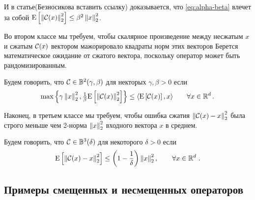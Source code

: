 \documentclass[12pt, twoside]{article}
\begin{document}
И в статье(Безносикова вставить ссылку) доказывается, что \eqref{eq:alpha-beta} влечет за собой ${{\rm E}}\left[ \left\| {\cal C}(x) \right\|_2^2 \right] \leq \beta^2 \left\| x \right\|_2^2$. 

Во втором классе мы требуем, чтобы скалярное произведение между несжатым $x$  и сжатым ${\cal C}(x)$ вектором мажорировало квадраты норм этих векторов Берется математическое ожидание от сжатого вектора, поскольку оператор может быть рандомизированным.

\begin{definition}\label{def:comp_II}
Будем говорить, что ${\cal C}\in \mathbb{B}^2(\gamma,\beta)$ для некторых $\gamma,\beta>0$ если
\begin{equation} \label{eq:alpha-betaII}
\max\left\{ \gamma \left\| x \right\|_2^2 , \tfrac{1}{\beta} {{\rm E}}\left[\left\| {\cal C}(x) \right\|_2^2\right]\right\} \leq \langle {{\rm E}}\left[{\cal C}(x)\right],x  \rangle \qquad \forall x\in\mathbb{R}^d \,.
\end{equation}
\end{definition}


Наконец, в третьем классе мы требуем, чтобы ошибка сжатия  $\left\| {\cal C}(x) - x \right\|_2^2$ была строго меньше чем 2-норма $\left\| x \right\|_2^2$ входного вектора $x$ в среднем.

\begin{definition}\label{def:comp_III}
Будем говорить, что ${\cal C}\in \mathbb{B}^3(\delta)$ для некоторого $\delta>0$ если
\begin{equation}\label{eq:biasedIII}
{{\rm E}}\left[ \left\| {\cal C}(x) - x \right\|_2^2 \right] \leq \left(1 - \frac{1}{\delta}\right)\left\| x \right\|_2^2, \qquad  \forall x\in\mathbb{R}^d \; .
\end{equation}
\end{definition}
\subsection{Примеры смещенных и несмещенных операторов}
\end{document}
